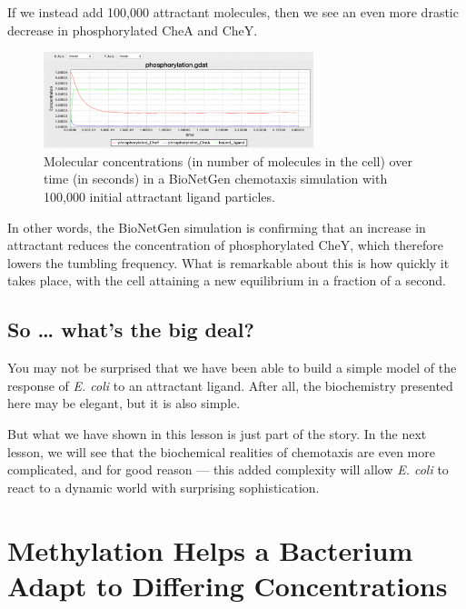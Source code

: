 If we instead add 100,000 attractant molecules, then we see an even more drastic decrease in phosphorylated CheA and CheY.

\begin{figure}[h]
\centering
\mySfFamily
\includegraphics[width = 0.7\textwidth]{../images/chemotaxis_tutorial7.png}
\caption{Molecular concentrations (in number of molecules in the cell) over time (in seconds) in a BioNetGen chemotaxis simulation with 100,000 initial attractant ligand particles.}
\label{fig:chemotaxis_tutorial7}
\end{figure}


In other words, the BioNetGen simulation is confirming that an increase in attractant reduces the concentration of phosphorylated CheY, which therefore lowers the tumbling frequency. What is remarkable about this is how quickly it takes place, with the cell attaining a new equilibrium in a fraction of a second.


\FloatBarrier
{}
{}
\subsection{So … what's the big deal?}

You may not be surprised that we have been able to build a simple model of the response of \textit{E. coli} to an attractant ligand. After all, the biochemistry presented here may be elegant, but it is also simple.

But what we have shown in this lesson is just part of the story. In the next lesson, we will see that the biochemical realities of chemotaxis are even more complicated, and for good reason --- this added complexity will allow \textit{E. coli} to react to a dynamic world with surprising sophistication.



\FloatBarrier
{}

\section{Methylation Helps a Bacterium Adapt to Differing Concentrations}
\label{sec:methylation}

